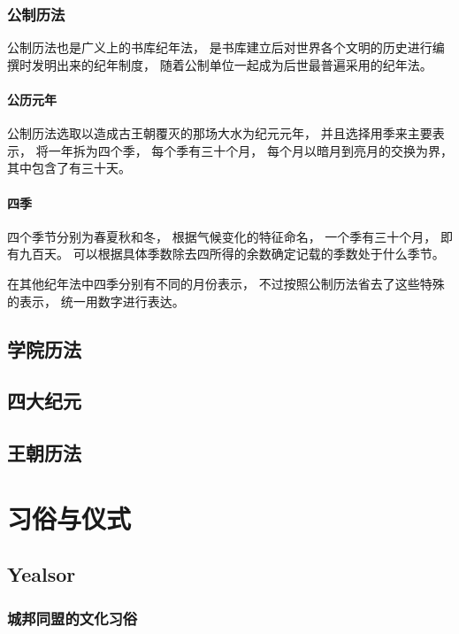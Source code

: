 \documentclass[UTF8,12pt,draft]{ctexbook}
\begin{document}
            \subsection{公制历法}
                公制历法也是广义上的书库纪年法，
                是书库建立后对世界各个文明的历史进行编撰时发明出来的纪年制度，
                随着公制单位一起成为后世最普遍采用的纪年法。
                \subsubsection{公历元年}
                    公制历法选取以造成古王朝覆灭的那场大水为纪元元年，
                    并且选择用季来主要表示，
                    将一年拆为四个季，
                    每个季有三十个月，
                    每个月以暗月到亮月的交换为界，
                    其中包含了有三十天。
                \subsubsection{四季}
                    四个季节分别为春夏秋和冬，
                    根据气候变化的特征命名，
                    一个季有三十个月，
                    即有九百天。
                    可以根据具体季数除去四所得的余数确定记载的季数处于什么季节。

                    在其他纪年法中四季分别有不同的月份表示，
                    不过按照公制历法省去了这些特殊的表示，
                    统一用数字进行表达。



        \section{学院历法}
        \section{四大纪元}
        \section{王朝历法}
    \chapter{习俗与仪式}
        \section{Yealsor}
            \subsection{城邦同盟的文化习俗}
\end{document}
